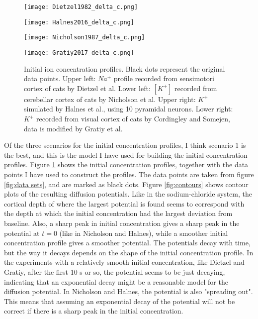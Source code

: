 \documentclass{article}
\begin{document}
\begin{figure}[!tbp]
  \centering
  \begin{minipage}[b]{0.45\textwidth}
    \texttt{[image: Dietzel1982\_delta\_c.png]}
  \end{minipage}
  \hfill
  \begin{minipage}[b]{0.45\textwidth}
    \texttt{[image: Halnes2016\_delta\_c.png]}
  \end{minipage}
    \begin{minipage}[b]{0.45\textwidth}
    \texttt{[image: Nicholson1987\_delta\_c.png]}
  \end{minipage}
  \hfill
  \begin{minipage}[b]{0.45\textwidth}
    \texttt{[image: Gratiy2017\_delta\_c.png]}
  \end{minipage}
  \caption{Initial ion concentration profiles. Black dots represent the original data points. Upper left: $Na^+$ profile recorded from sensimotori cortex of cats by Dietzel et al. Lower left: $[K^+]$  recorded from cerebellar cortex of cats by Nicholson et al. Upper right:  $K^+$ simulated by Halnes et al., using 10 pyramidal neurons. Lower right: $K^+$ recorded from visual cortex of cats by Cordingley and Somejen, data is modified by Gratiy et al.}
  \label{fig:initial concentrations}
\end{figure} 
Of the three scenarios for the initial concentration profiles, I think scenario 1 is the best, and this is the model I have used for building the initial concentration profiles. Figure \ref{fig:initial concentrations} shows the initial concentration profiles, together with the data points I have used to construct the profiles. The data points are taken from figure \ref{fig:data sets}, and are marked as black dots. Figure \ref{fig:contours} shows contour plots of the resulting diffusion potentials. Like in the sodium-chloride system, the cortical depth of where the largest potential is found seems to correspond with the depth at which the initial concentration had the largest deviation from baseline. Also, a sharp peak in initial concentration gives a sharp peak in the potential at $t=0$ (like in Nicholson and Halnes), while a smoother initial concentration profile gives a smoother potential. The potentials decay with time, but the way it decays depends on the shape of the initial concentration profile. In the experiments with a relatively smooth initial concentration, like Dietzel and Gratiy, after the first 10 s or so, the potential seems to be just decaying, indicating that an exponential decay might be a reasonable model for the diffusion potential. In Nicholson and Halnes, the potential is also "spreading out". This means that assuming an exponential decay of the potential will not be correct if there is a sharp peak in the initial concentration. 
\end{document}
